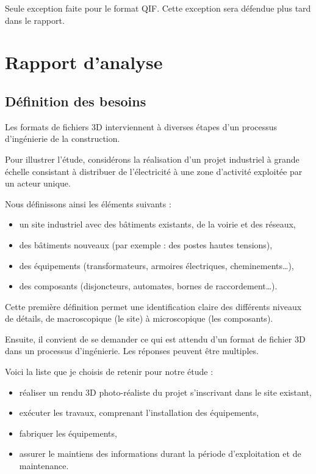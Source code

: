 \documentclass[a4paper,12pt]{article}
\begin{document}
Seule exception faite pour le format QIF. Cette exception sera défendue plus tard dans le rapport.
\section*{Rapport d'analyse}
\label{sec:orgaf82518}
\subsection*{Définition des besoins}
\label{sec:org9a1767f}

Les formats de fichiers 3D interviennent à diverses étapes d'un processus d'ingénierie de la construction.

Pour illustrer l'étude, considérons la réalisation d'un projet industriel à grande échelle consistant à distribuer de l'électricité à une zone d'activité exploitée par un acteur unique. 

Nous définissons ainsi les éléments suivants :
\begin{itemize}
\item un site industriel avec des bâtiments existants, de la voirie et des réseaux,
\item des bâtiments nouveaux (par exemple : des postes hautes tensions),
\item des équipements (transformateurs, armoires électriques, cheminements\ldots{}),
\item des composants (disjoncteurs, automates, bornes de raccordement\ldots{}).
\end{itemize}

Cette première définition permet une identification claire des différents niveaux de détails, de macroscopique (le site) à microscopique (les composants).

Ensuite, il convient de se demander ce qui est attendu d'un format de fichier 3D dans un processus d'ingénierie. Les réponses peuvent être multiples. 

Voici la liste que je choisis de retenir pour notre étude :
\begin{itemize}
\item réaliser un rendu 3D photo-réaliste du projet s'inscrivant dans le site existant,
\item exécuter les travaux, comprenant l'installation des équipements,
\item fabriquer les équipements,
\item assurer le maintiens des informations durant la période d'exploitation et de maintenance.
\end{itemize}
\end{document}
